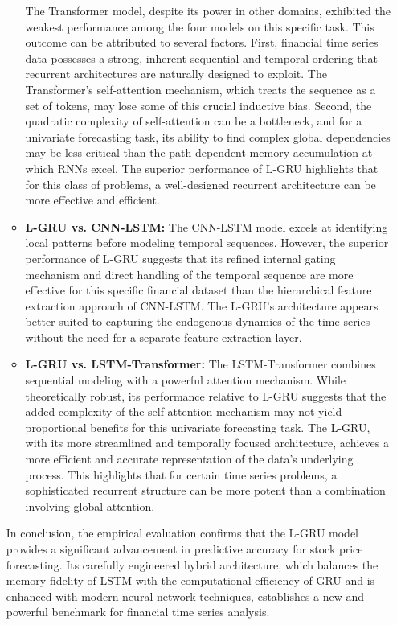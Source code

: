 \documentclass{cys}
\begin{document}
\begin{enumerate}
\begin{itemize}
        The Transformer model, despite its power in other domains, exhibited the weakest performance among the four models on this specific task. This outcome can be attributed to several factors. First, financial time series data possesses a strong, inherent sequential and temporal ordering that recurrent architectures are naturally designed to exploit. The Transformer's self-attention mechanism, which treats the sequence as a set of tokens, may lose some of this crucial inductive bias. Second, the quadratic complexity of self-attention can be a bottleneck, and for a univariate forecasting task, its ability to find complex global dependencies may be less critical than the path-dependent memory accumulation at which RNNs excel. The superior performance of L-GRU highlights that for this class of problems, a well-designed recurrent architecture can be more effective and efficient.
        \item \textbf{L-GRU vs. CNN-LSTM:}
        The CNN-LSTM model excels at identifying local patterns before modeling temporal sequences. However, the superior performance of L-GRU suggests that its refined internal gating mechanism and direct handling of the temporal sequence are more effective for this specific financial dataset than the hierarchical feature extraction approach of CNN-LSTM. The L-GRU's architecture appears better suited to capturing the endogenous dynamics of the time series without the need for a separate feature extraction layer.
        \item \textbf{L-GRU vs. LSTM-Transformer:}
        The LSTM-Transformer combines sequential modeling with a powerful attention mechanism. While theoretically robust, its performance relative to L-GRU suggests that the added complexity of the self-attention mechanism may not yield proportional benefits for this univariate forecasting task. The L-GRU, with its more streamlined and temporally focused architecture, achieves a more efficient and accurate representation of the data's underlying process. This highlights that for certain time series problems, a sophisticated recurrent structure can be more potent than a combination involving global attention.
    \end{itemize}
    In conclusion, the empirical evaluation confirms that the L-GRU model provides a significant advancement in predictive accuracy for stock price forecasting. Its carefully engineered hybrid architecture, which balances the memory fidelity of LSTM with the computational efficiency of GRU and is enhanced with modern neural network techniques, establishes a new and powerful benchmark for financial time series analysis.
    \end{enumerate}
\end{document}
